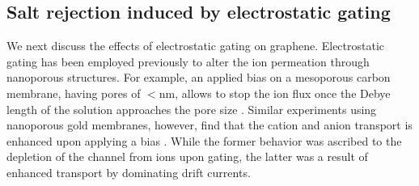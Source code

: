\documentclass[journal=nalefd,email=true, hyperref=true, keywords=false]{achemso}
\begin{document}
\subsection{Salt rejection induced by electrostatic gating}
\label{sec:res-2}

We next discuss the effects of electrostatic gating on graphene. 
{ Electrostatic gating has been employed previously to alter the 
ion permeation through nanoporous structures. For example, an applied bias on a mesoporous 
carbon membrane, having pores of $<$\unit[5]{nm}, allows to stop the 
ion flux once the Debye length of the solution approaches the pore size \cite{Surwade_2014}. 
Similar experiments using nanoporous gold membranes, however, find that the cation and anion 
transport is enhanced upon applying a bias \cite{mccurry2017electrolyte}. While the former behavior 
was ascribed to the depletion of the channel from ions upon gating, the latter was a result of enhanced transport
by dominating drift currents.}
\end{document}

